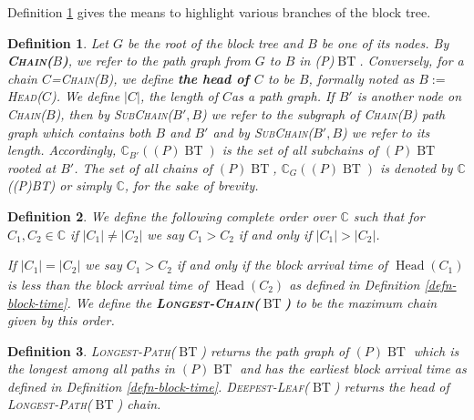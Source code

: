 \documentclass{book}
\newcommand{\assign}{:=}
\newcommand{\tmname}[1]{\textsc{#1}}
\newcommand{\tmop}[1]{\ensuremath{\operatorname{#1}}}
\newcommand{\tmstrong}[1]{\textbf{#1}}
\newcommand{\tmtextbf}[1]{{\bfseries{#1}}}
\newcommand{\tmtextsc}[1]{{\scshape{#1}}}
\newtheorem{definition}{Definition}
\providecommand{\tmname}[1]{\tmtextsc{#1}}
\providecommand{\tmop}[1]{\ensuremath{\mathrm{#1}}}
\providecommand{\tmstrong}[1]{\tmtextbf{#1}}
\providecommand{\tmtextbf}[1]{\tmtextbf{#1}}
\newtheorem{definition}{Definition}
\begin{document}
Definition \ref{defn-chain-subchain} gives the means to highlight various
branches of the block tree.

\begin{definition}
  \label{defn-chain-subchain}Let \label{autolab14}$G$ be the root of the block
  tree and $B$ be one of its nodes. By
  \label{autolab15}{\tmname{{\tmstrong{Chain($B$)}},}} we refer to the path
  graph from $G$ to $B$ in (P)$\tmop{BT}$. Conversely, for a chain
  $C$={\tmname{Chain(B)}}, we define \label{autolab16}{\tmstrong{the head of
  $C$}} to be $B$, formally noted as $B \assign${\tmname{Head($C$)}}. We
  define \label{autolab17}$| C |$, the length of $C$as a path graph. If $B'$
  is another node on {\tmname{Chain($B$)}}, then by
  \label{autolab18}{\tmname{SubChain($B', B$)}} we refer to the subgraph of
  {\tmname{Chain($B$)}} path graph which contains both $B$ and $B'$ and by
  {\tmname{\textbar SubChain($B', B$)\textbar}} we refer to its length.
  Accordingly, \label{autolab19}$\mathbb{C}_{B'} ((P) \tmop{BT})$ is the set
  of all subchains of $(P) \tmop{BT}$ rooted at $B'$. The set of all chains of
  $(P) \tmop{BT}$, $\mathbb{C}_G ((P) \tmop{BT})$ is denoted by
  $\mathbb{C}$((P)BT) or simply \label{autolab20}$\mathbb{C}$, for the sake of
  brevity.
\end{definition}

\begin{definition}
  \label{defn-longest-chain}We define the following complete order over
  $\mathbb{C}$ such that for $C_1, C_2 \in \mathbb{C}$ if $| C_1 | \neq | C_2
  |$ we say $C_1 > C_2$ if and only if $| C_1 | > | C_2 |$.
  
  If $| C_1 | = | C_2 |$ we say $C_1 > C_2$ if and only if the block arrival
  time of $\tmop{Head} (C_1)_{}$ is less than the block arrival time of
  $\tmop{Head} (C_2)$ as defined in Definition \ref{defn-block-time}. We
  define the
  \label{autolab21}{\tmstrong{{\tmname{Longest-Chain($\tmop{BT}$)}}}} to be
  the maximum chain given by this order.
\end{definition}

\begin{definition}
  \label{autolab22}{\tmname{Longest-Path($\tmop{BT}$)}} returns the path graph
  of $(P) \tmop{BT}$ which is the longest among all paths in $(P) \tmop{BT}$
  and has the earliest block arrival time as defined in Definition
  \ref{defn-block-time}. \label{autolab23}
  {\tmname{Deepest-Leaf($\tmop{BT}$)}} returns the head of
  {\tmname{Longest-Path($\tmop{BT}$)}} chain.
\end{definition}
\end{document}

